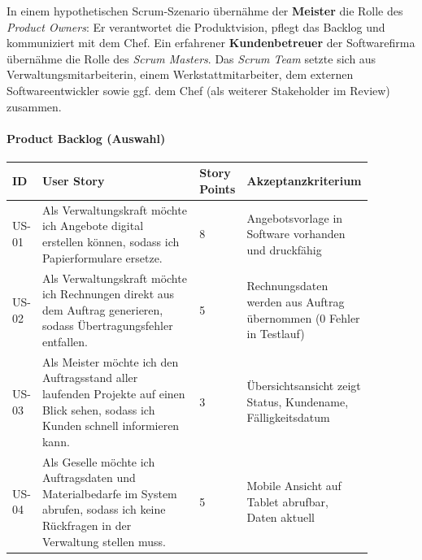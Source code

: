 \documentclass[
    a4paper,
    11pt,
    bibliography=totoc,
    listof=totoc,
    parskip=half,
    headings=normal
]{scrbook}
\begin{document}
In einem hypothetischen Scrum-Szenario übernähme der \textbf{Meister} die
Rolle des \textit{Product Owners}: Er verantwortet die Produktvision, pflegt das
Backlog und kommuniziert mit dem Chef. Ein erfahrener \textbf{Kundenbetreuer}
der Softwarefirma übernähme die Rolle des \textit{Scrum Masters}. Das
\textit{Scrum Team} setzte sich aus Verwaltungsmitarbeiterin, einem
Werkstattmitarbeiter, dem externen Softwareentwickler sowie ggf. dem Chef
(als weiterer Stakeholder im Review) zusammen.

\paragraph{Product Backlog (Auswahl)}

\begin{longtable}{@{}p{0.08\linewidth}p{0.47\linewidth}p{0.08\linewidth}p{0.25\linewidth}@{}}
      \toprule
      \textbf{ID}                                                & \textbf{User Story}                                                                                                                     & \textbf{Story Points} & \textbf{Akzeptanzkriterium}                                         \\
      \midrule
      \endhead
      US-01                                                      & Als Verwaltungskraft möchte ich Angebote digital erstellen können, sodass ich Papierformulare ersetze.                                  & 8                     & Angebotsvorlage in Software vorhanden und druckfähig                \\
      US-02                                                      & Als Verwaltungskraft möchte ich Rechnungen direkt aus dem Auftrag generieren, sodass Übertragungsfehler entfallen.                      & 5                     & Rechnungsdaten werden aus Auftrag übernommen (0 Fehler in Testlauf) \\
      US-03                                                      & Als Meister möchte ich den Auftragsstand aller laufenden Projekte auf einen Blick sehen, sodass ich Kunden schnell informieren kann.    & 3                     & Übersichtsansicht zeigt Status, Kundename, Fälligkeitsdatum         \\
      US-04                                                      & Als Geselle möchte ich Auftragsdaten und Materialbedarfe im System abrufen, sodass ich keine Rückfragen in der Verwaltung stellen muss. & 5                     & Mobile Ansicht auf Tablet abrufbar, Daten aktuell                   \\

\end{longtable}
\end{document}

